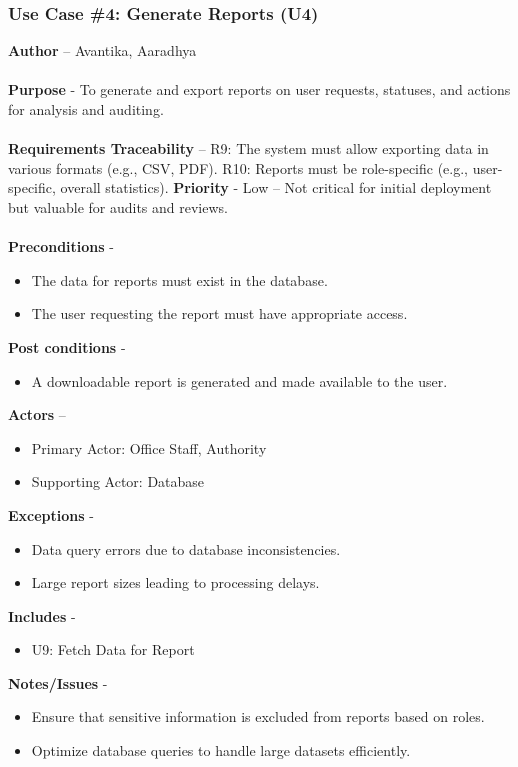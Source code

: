 \documentclass[a4paper,12pt]{article}
\begin{document}
 \subsubsection{Use Case \#4: Generate Reports (U4)}
\textbf{Author} – Avantika, Aaradhya \\\\
\textbf{Purpose} - To generate and export reports on user requests, statuses, and actions for analysis and auditing. \\\\
\textbf{Requirements Traceability} – 
R9: The system must allow exporting data in various formats (e.g., CSV, PDF).
R10: Reports must be role-specific (e.g., user-specific, overall statistics).
\textbf{Priority} - Low – Not critical for initial deployment but valuable for audits and reviews. \\\\
\textbf{Preconditions} - 
\begin{itemize} 
    \item The data for reports must exist in the database.
    \item The user requesting the report must have appropriate access.
\end{itemize}
\textbf{Post conditions} - 
\begin{itemize} 
    \item A downloadable report is generated and made available to the user.
\end{itemize}
\textbf{Actors} – 
\begin{itemize} 
    \item Primary Actor: Office Staff, Authority
    \item Supporting Actor: Database
\end{itemize}
\textbf{Exceptions} - 
\begin{itemize} 
    \item Data query errors due to database inconsistencies.
    \item Large report sizes leading to processing delays.
\end{itemize}
\textbf{Includes} - 
\begin{itemize} 
    \item U9: Fetch Data for Report
\end{itemize}
\textbf{Notes/Issues} - 
\begin{itemize} 
    \item Ensure that sensitive information is excluded from reports based on roles.
    \item Optimize database queries to handle large datasets efficiently.
\end{itemize}
\newpage
\end{document}
